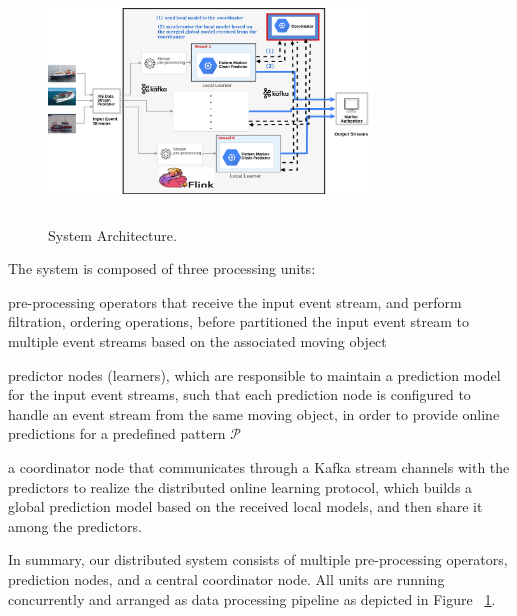 \begin{figure}[h]

\includegraphics[height=2.5in, width=3.4in]{figures/distributed_architecture.png}
	
\caption{System Architecture.}
\label{fig:architecture}
\end{figure}

The system is composed of three processing units:   \begin{enumerate*}[(i)]
	\item pre-processing operators that receive the input event stream, and perform filtration, ordering operations, before partitioned the input event stream to multiple event streams based on the associated moving object 
	\item predictor nodes (learners), which are responsible to maintain a prediction model for the input event streams, such that each prediction node is configured to handle an event stream from the same moving object, in order to provide online predictions for a predefined pattern $\mathcal{P}$  
	\item a coordinator node that communicates through a Kafka stream channels with the predictors to realize the distributed online learning protocol, which builds a global prediction model based on the received local models, and then share it among the predictors.
\end{enumerate*}

In summary, our distributed system consists of multiple pre-processing operators, prediction nodes,  and a central coordinator node. All units are running concurrently and arranged as data processing pipeline as depicted in Figure ~\ref{fig:architecture}.
